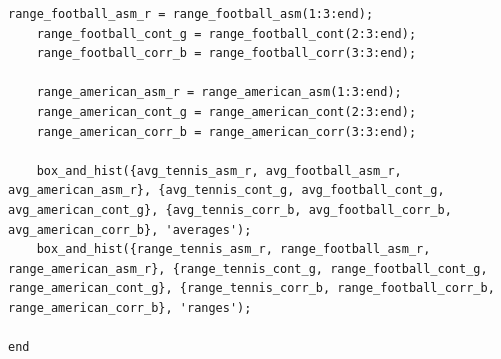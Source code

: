 \documentclass[conference]{IEEEtran}
\begin{document}
\begin{lstlisting}[style=Matlab-editor, basicstyle=\scriptsize]
    range_football_asm_r = range_football_asm(1:3:end);
    range_football_cont_g = range_football_cont(2:3:end);
    range_football_corr_b = range_football_corr(3:3:end);

    range_american_asm_r = range_american_asm(1:3:end);
    range_american_cont_g = range_american_cont(2:3:end);
    range_american_corr_b = range_american_corr(3:3:end);

    box_and_hist({avg_tennis_asm_r, avg_football_asm_r, avg_american_asm_r}, {avg_tennis_cont_g, avg_football_cont_g, avg_american_cont_g}, {avg_tennis_corr_b, avg_football_corr_b, avg_american_corr_b}, 'averages');
    box_and_hist({range_tennis_asm_r, range_football_asm_r, range_american_asm_r}, {range_tennis_cont_g, range_football_cont_g, range_american_cont_g}, {range_tennis_corr_b, range_football_corr_b, range_american_corr_b}, 'ranges');

end
            \end{lstlisting}
\end{document}
